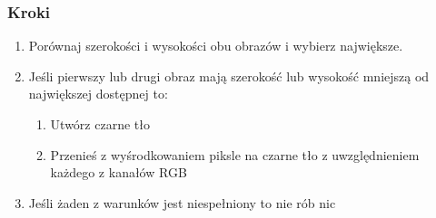 \documentclass[a4paper,12pt]{book}
\begin{document}
\subsubsection*{Kroki}
\begin{enumerate}
	\item Porównaj szerokości i wysokości obu obrazów i wybierz największe. 
	\item Jeśli pierwszy lub drugi obraz mają szerokość lub wysokość mniejszą od największej dostępnej to:
	\begin{enumerate}
		\item Utwórz czarne tło
		\item Przenieś z wyśrodkowaniem piksle na czarne tło z uwzględnieniem każdego z kanałów RGB
	\end{enumerate}
	\item Jeśli żaden z warunków jest niespełniony to nie rób nic
\end{enumerate}
\end{document}
